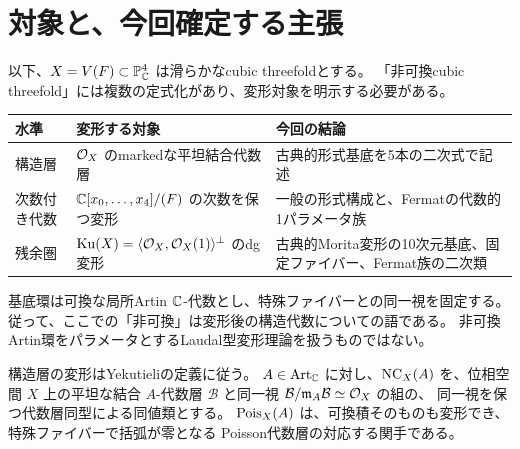 \section{対象と、今回確定する主張}

以下、$X=V(F)\subset\mathbb P^4_{\mathbb C}$ は滑らかなcubic threefoldとする。
「非可換cubic threefold」には複数の定式化があり、変形対象を明示する必要がある。

\begin{center}
\small
\begin{tabular}{p{}p{}p{}}
\toprule
水準 & 変形する対象 & 今回の結論\\
\midrule
構造層 &
$\mathcal O_X$ のmarkedな平坦結合代数層 &
古典的形式基底を5本の二次式で記述\\
次数付き代数 &
$\mathbb C[x_0,\ldots,x_4]/(F)$ の次数を保つ変形 &
一般の形式構成と、Fermatの代数的1パラメータ族\\
残余圏 &
$\operatorname{Ku}(X)=\langle\mathcal O_X,\mathcal O_X(1)\rangle^\perp$ のdg変形 &
古典的Morita変形の10次元基底、固定ファイバー、Fermat族の二次類\\
\bottomrule
\end{tabular}
\end{center}

基底環は可換な局所Artin $\mathbb C$-代数とし、特殊ファイバーとの同一視を固定する。
従って、ここでの「非可換」は変形後の構造代数についての語である。
非可換Artin環をパラメータとするLaudal型変形理論を扱うものではない。

構造層の変形はYekutieliの定義\cite[Definitions 2.7--2.8]{Yek}に従う。
$A\in\operatorname{Art}_{\mathbb C}$ に対し、$\operatorname{NC}_X(A)$ を、位相空間 $X$ 上の平坦な結合 $A$-代数層
$\mathscr B$ と同一視 $\mathcal B/\mathfrak m_A\mathcal B\simeq\mathcal O_X$ の組の、
同一視を保つ代数層同型による同値類とする。
$\operatorname{Pois}_X(A)$ は、可換積そのものも変形でき、特殊ファイバーで括弧が零となる
Poisson代数層の対応する関手である。

